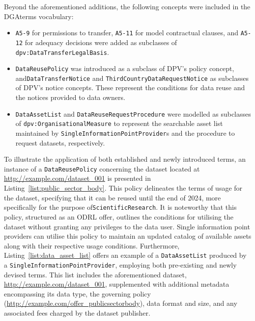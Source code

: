 Beyond the aforementioned additions, the following concepts were included in the DGAterms vocabulary:
\begin{itemize}
    \item \texttt{A5-9} for permissions to transfer, \texttt{A5-11} for model contractual clauses, and \texttt{A5-12} for adequacy decisions were added as subclasses of \texttt{dpv:DataTransferLegalBasis}.
    \item \texttt{DataReusePolicy} was introduced as a subclass of DPV's policy concept, and\linebreak \texttt{DataTransferNotice} and \texttt{ThirdCountryDataRequestNotice} as subclasses of DPV's notice concepts. These represent the conditions for data reuse and the notices provided to data owners.
    \item \texttt{DataAssetList} and \texttt{DataReuseRequestProcedure} were modelled as subclasses of \texttt{dpv:OrganisationalMeasure} to represent the searchable asset list maintained by \texttt{SingleInformationPointProvider}s and the procedure to request datasets, respectively.
\end{itemize}

To illustrate the application of both established and newly introduced terms, an instance of a \texttt{DataReusePolicy} concerning the dataset located at \url{http://example.com/dataset_001} is presented in Listing~\ref{list:public_sector_body}.
This policy delineates the terms of usage for the dataset, specifying that it can be reused until the end of 2024, more specifically for the purpose of\linebreak \texttt{ScientificResearch}.
It is noteworthy that this policy, structured as an ODRL offer, outlines the conditions for utilising the dataset without granting any privileges to the data user.
Single information point providers can utilise this policy to maintain an updated catalog of available assets along with their respective usage conditions.
Furthermore, Listing~\ref{list:data_asset_list} offers an example of a \texttt{DataAssetList} produced by a \texttt{SingleInformationPointProvider}, employing both pre-existing and newly devised terms.
This list includes the aforementioned dataset, \url{http://example.com/dataset_001}, supplemented with additional metadata encompassing its data type, the governing policy (\url{http://example.com/offer_publicsectorbody}), data format and size, and any associated fees charged by the dataset publisher.

